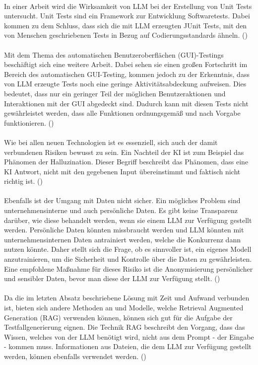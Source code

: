 \documentclass[12pt,toc=bib,toc=listof]{scrreprt}
\begin{document}
\\
In einer Arbeit wird die Wirksamkeit von LLM bei der Erstellung von Unit Tests untersucht. Unit Tests sind ein Framework zur Entwicklung Softwaretests. Dabei kommen \textcite{Ouédraogo2024} zu dem Schluss, dass sich die mit LLM erzeugten JUnit Tests, mit den von Menschen geschriebenen Tests in Bezug auf Codierungsstandards ähneln. (\cite{Ouédraogo2024})\\
\\
Mit dem Thema des automatischen Benutzeroberflächen (GUI)-Testings beschäftigt sich eine weitere Arbeit. Dabei sehen sie einen großen Fortschritt im Bereich des automatischen GUI-Testing, kommen jedoch zu der Erkenntnis, dass von LLM erzeugte Tests noch eine geringe Aktivitätsabdeckung aufweisen. Dies bedeutet, dass nur ein geringer Teil der möglichen Benutzeraktionen und Interaktionen mit der GUI abgedeckt sind. Dadurch kann mit diesen Tests nicht gewährleistet werden, dass alle Funktionen ordnungsgemäß und nach Vorgabe funktionieren. (\cite{Liu2024})\\
\\
Wie bei allen neuen Technologien ist es essenziell, sich auch der damit verbundenen Risiken bewusst zu sein. Ein Nachteil der KI ist zum Beispiel das Phänomen der Halluzination. Dieser Begriff beschreibt das Phänomen, dass eine KI Antwort, nicht mit den gegebenen Input übereinstimmt und faktisch nicht richtig ist. (\cite{Siebert2024})\\
\\
Ebenfalls ist der Umgang mit Daten nicht sicher. Ein mögliches Problem sind unternehmensinterne und auch persönliche Daten. Es gibt keine Transparenz darüber, wie diese behandelt werden, wenn sie einem LLM zur Verfügung gestellt werden. Persönliche Daten könnten missbraucht werden und LLM könnten mit unternehmensinternen Daten antrainiert werden, welche die Konkurrenz dann nutzen könnte. Daher stellt sich die Frage, ob es sinnvoller ist, ein eigenes Modell anzutrainieren, um die Sicherheit und Kontrolle über die Daten zu gewährleisten. Eine empfohlene Maßnahme für dieses Risiko ist die Anonymisierung persönlicher und sensibler Daten, bevor man diese der LLM zur Verfügung stellt. (\cite{Möllers2024})\\
\\
Da die im letzten Absatz beschriebene Lösung mit Zeit und Aufwand verbunden ist, bieten sich andere Methoden an und Modelle, welche Retrieval Augmented Generation (RAG) verwenden können, können sich gut für die Aufgabe der Testfallgenerierung eignen. Die Technik RAG beschreibt den Vorgang, dass das Wissen, welches von der LLM benötigt wird, nicht aus dem Prompt - der Eingabe - kommen muss. Informationen aus Dateien, die dem LLM zur Verfügung gestellt werden, können ebenfalls verwendet werden. (\cite{Honroth2024})
\end{document}
